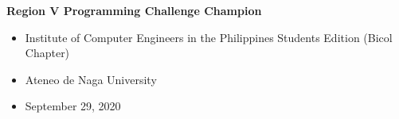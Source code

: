 \documentclass{amsbook}
\begin{document}
\textbf{Region V Programming Challenge Champion}
\begin{itemize}
    \item Institute of Computer Engineers in the Philippines Students Edition (Bicol Chapter)
    \item Ateneo de Naga University
    \item September 29, 2020
\end{itemize}
\end{document}
